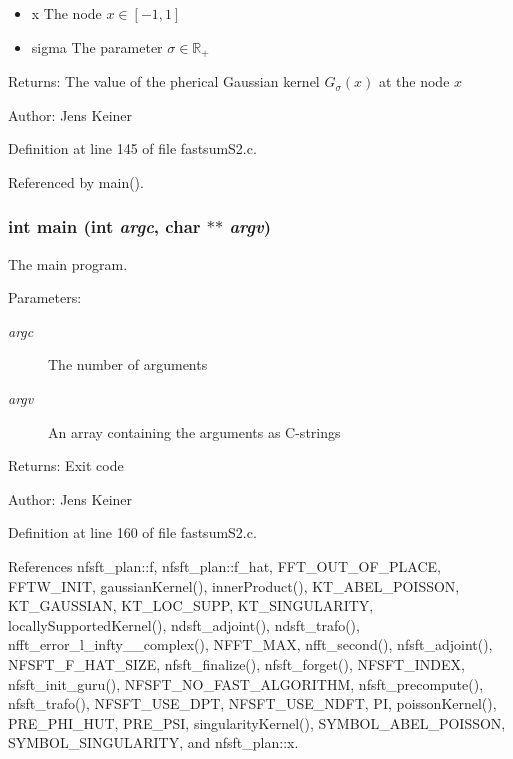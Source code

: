 \begin{itemize}
\item x The node $x \in [-1,1]$ \item sigma The parameter $\sigma \in \mathbb{R}_+$\end{itemize}
\begin{Desc}
\item[Returns:]The value of the pherical Gaussian kernel $G_\sigma(x)$ at the node $x$\end{Desc}
\begin{Desc}
\item[Author:]Jens Keiner \end{Desc}


Definition at line 145 of file fastsum\-S2.c.

Referenced by main().\hypertarget{group__applications__fastsumS2__test_ga5}{
\subsubsection[main]{\setlength{\rightskip}{0pt plus 5cm}int main (int {\em argc}, char $\ast$$\ast$ {\em argv})}}
\label{group__applications__fastsumS2__test_ga5}


The main program. 

\begin{Desc}
\item[Parameters:]
\begin{description}
\item[{\em argc}]The number of arguments \item[{\em argv}]An array containing the arguments as C-strings\end{description}
\end{Desc}
\begin{Desc}
\item[Returns:]Exit code\end{Desc}
\begin{Desc}
\item[Author:]Jens Keiner \end{Desc}


Definition at line 160 of file fastsum\-S2.c.

References nfsft\_\-plan::f, nfsft\_\-plan::f\_\-hat, FFT\_\-OUT\_\-OF\_\-PLACE, FFTW\_\-INIT, gaussian\-Kernel(), inner\-Product(), KT\_\-ABEL\_\-POISSON, KT\_\-GAUSSIAN, KT\_\-LOC\_\-SUPP, KT\_\-SINGULARITY, locally\-Supported\-Kernel(), ndsft\_\-adjoint(), ndsft\_\-trafo(), nfft\_\-error\_\-l\_\-infty\_\_\-complex(), NFFT\_\-MAX, nfft\_\-second(), nfsft\_\-adjoint(), NFSFT\_\-F\_\-HAT\_\-SIZE, nfsft\_\-finalize(), nfsft\_\-forget(), NFSFT\_\-INDEX, nfsft\_\-init\_\-guru(), NFSFT\_\-NO\_\-FAST\_\-ALGORITHM, nfsft\_\-precompute(), nfsft\_\-trafo(), NFSFT\_\-USE\_\-DPT, NFSFT\_\-USE\_\-NDFT, PI, poisson\-Kernel(), PRE\_\-PHI\_\-HUT, PRE\_\-PSI, singularity\-Kernel(), SYMBOL\_\-ABEL\_\-POISSON, SYMBOL\_\-SINGULARITY, and nfsft\_\-plan::x.